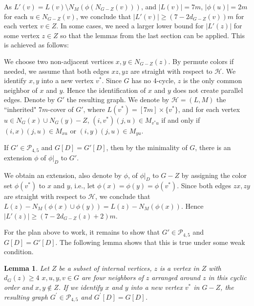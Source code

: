 \documentclass{article}
\newtheorem{lemma}{Lemma}
\begin{document}
As $L'(v) = L(v) \setminus N_M(\phi(N_{G-Z}(v)))$, and $|L(v)|=7m$, $|\phi(u)|=2m$ for each $u \in N_{G-Z}(v)$, we conclude that $|L'(v)| \ge (7-2 d_{G-Z}(v))m$ for each vertex $v \in Z$. In some cases, we need a larger lower bound for $|L'(z)|$ for some vertex $z \in Z$ so that the lemmas from the last section can be applied. This is achieved as follows: 


We choose two non-adjacent vertices $x,y \in N_{G-Z}(z)$. By permute colors if needed, we   assume that both edges $xz, yz$ are straight with respect to $\mathcal{H}$.
We identify $x,y$ into a new vertex $v^*$.  Since $G$ has no 4-cycle, $z$ is the only common neighbor of $x$ and $y$. Hence the identification of $x$ and $y$ does not create  parallel edges. Denote by $G'$ the resulting graph. We denote by $\mathcal{H}=(L,M)$ the ``inherited" $7m$-cover of $G'$, where $L(v^*)=[7m] \times \{v^*\}$, and for each vertex $u \in N_G(x) \cup N_G(y) - Z$,   $(i,v^*) (j,u) \in M_{v^*u}$ if and only if $(i,x)(j,u) \in M_{xu}$ or $(i,y)(j,u) \in M_{yu}$.

If $G' \in \mathcal{P}_{4,5}$ and $G[D]=G'[D]$, then by the minimality of $G$, there is an extension $\phi$ of $\phi|_D$ to $G'$. 

We obtain an extension, also denote by $\phi$, of $\phi|_D$ to $G-Z$ by assigning the color set $\phi(v^*)$ to $x$ and $y$, i.e., let $\phi(x)= \phi(y) = \phi(v^*)$. Since both edges $zx,zy$ are straight with respect to $\mathcal{H}$, we conclude that 
$L(z)-N_M(\phi(x) \cup \phi(y)) = L(z)-N_M(\phi(x))$.  Hence $|L'(z)| \ge (7-2 d_{G-Z}(z)+2)m$. 


For the plan above to work, it remains to show that 
$G' \in \mathcal{P}_{4,5}$ and $G[D]=G'[D]$.  The following lemma shows that this is true under some weak condition.

\begin{lemma}
    \label{lem-p45} Let $Z$ be a subset of internal vertices, $z$ is a vertex in $Z$ with $d_G(z)\ge 4$ $x,u,y, v \in G$ are four neighbors of $z$   arranged around $z$ in this cyclic order and $x,y \notin Z$.   If we   identify $x$ and $y$ into a new vertex $v^*$ in $G-Z$, the resulting graph  $G^{\prime} \in \mathcal{P}_{4,5}$ and $G^{\prime}[D]=G[D]$.
\end{lemma}
\end{document}
